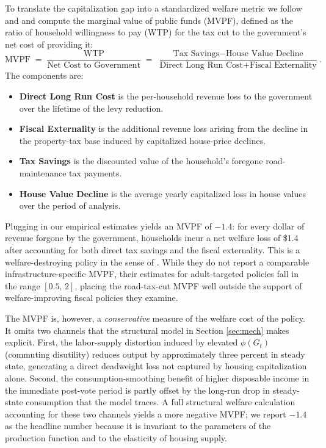 To translate the capitalization gap into a standardized welfare metric we follow \cite{hendren2020unified} and \cite{finkelstein2020welfare} and compute the marginal value of public funds (MVPF), defined as the ratio of household willingness to pay (WTP) for the tax cut to the government's net cost of providing it:
\begin{equation}
\text{MVPF} \;=\; \frac{\text{WTP}}{\text{Net Cost to Government}}
\;=\; \frac{\text{Tax Savings} - \text{House Value Decline}}{\text{Direct Long Run Cost} + \text{Fiscal Externality}}.
\end{equation}
The components are:
\begin{itemize}
    \item \textbf{Direct Long Run Cost} is the per-household revenue loss to the government over the lifetime of the levy reduction.
    \item \textbf{Fiscal Externality} is the additional revenue loss arising from the decline in the property-tax base induced by capitalized house-price declines.
    \item \textbf{Tax Savings} is the discounted value of the household's foregone road-maintenance tax payments.
    \item \textbf{House Value Decline} is the average yearly capitalized loss in house values over the period of analysis.
\end{itemize}

Plugging in our empirical estimates yields an MVPF of $-1.4$: for every dollar of revenue forgone by the government, households incur a net welfare loss of \$1.4 after accounting for both direct tax savings and the fiscal externality. This is a welfare-destroying policy in the sense of \citet{hendren2020unified}. While they do not report a comparable infrastructure-specific MVPF, their estimates for adult-targeted policies fall in the range $[0.5,\, 2]$, placing the road-tax-cut MVPF well outside the support of welfare-improving fiscal policies they examine.

The MVPF is, however, a {\it conservative} measure of the welfare cost of the policy. It omits two channels that the structural model in Section \ref{sec:mech} makes explicit. First, the labor-supply distortion induced by elevated $\phi(G_t)$ (commuting disutility) reduces output by approximately three percent in steady state, generating a direct deadweight loss not captured by housing capitalization alone. Second, the consumption-smoothing benefit of higher disposable income in the immediate post-vote period is partly offset by the long-run drop in steady-state consumption that the model traces. A full structural welfare calculation accounting for these two channels yields a more negative MVPF; we report $-1.4$ as the headline number because it is invariant to the parameters of the production function and to the elasticity of housing supply.

